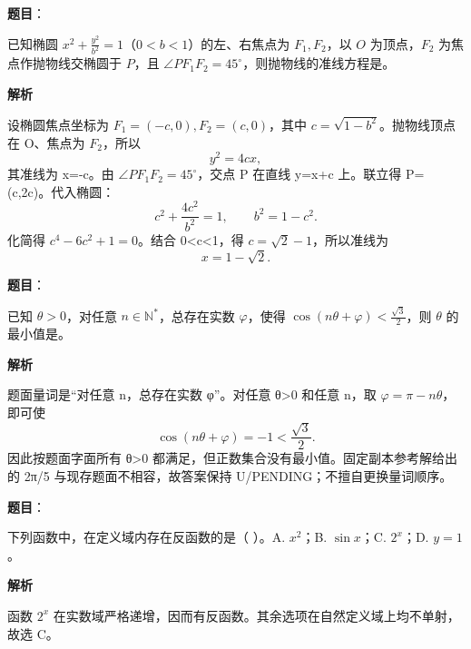 \begin{answer}

\textbf{题目}：

已知椭圆 $x^2+\frac{y^2}{b^2}=1$（$0<b<1$）的左、右焦点为 $F_1,F_2$，以 $O$ 为顶点，$F_2$ 为焦点作抛物线交椭圆于 $P$，且 $\angle PF_1F_2=45^\circ$，则抛物线的准线方程是\gkblank{}。

\textbf{解析}

设椭圆焦点坐标为 \(F_1=(-c,0),F_2=(c,0)\)，其中 \(c=\sqrt{1-b^2}\)。抛物线顶点在 O、焦点为 \(F_2\)，所以
\nopagebreak[4]
\[
y^2=4cx,
\]
其准线为 x=-c。由 \(\angle PF_1F_2=45^\circ\)，交点 P 在直线 y=x+c 上。联立得 P=(c,2c)。代入椭圆：
\nopagebreak[4]
\[
c^2+\frac{4c^2}{b^2}=1,\qquad b^2=1-c^2.
\]
化简得 \(c^4-6c^2+1=0\)。结合 0<c<1，得 \(c=\sqrt2-1\)，所以准线为
\nopagebreak[4]
\[
x=1-\sqrt2.
\]


\end{answer}
\begin{answer}

\textbf{题目}：

已知 $\theta>0$，对任意 $n\in\mathbb N^*$，总存在实数 $\varphi$，使得 $\cos(n\theta+\varphi)<\frac{\sqrt3}{2}$，则 $\theta$ 的最小值是\gkblank{}。

\textbf{解析}

题面量词是“对任意 n，总存在实数 φ”。对任意 θ>0 和任意 n，取 \(\varphi=\pi-n\theta\)，即可使
\nopagebreak[4]
\[
\cos(n\theta+\varphi)=-1<\frac{\sqrt3}{2}.
\]
因此按题面字面所有 θ>0 都满足，但正数集合没有最小值。固定副本参考解给出的 2π/5 与现存题面不相容，故答案保持 U/PENDING；不擅自更换量词顺序。


\end{answer}
\begin{answer}

\textbf{题目}：

下列函数中，在定义域内存在反函数的是（ ）。A. $x^2$；B. $\sin x$；C. $2^x$；D. $y=1$。

\textbf{解析}

函数 \(2^x\) 在实数域严格递增，因而有反函数。其余选项在自然定义域上均不单射，故选 C。


\end{answer}
